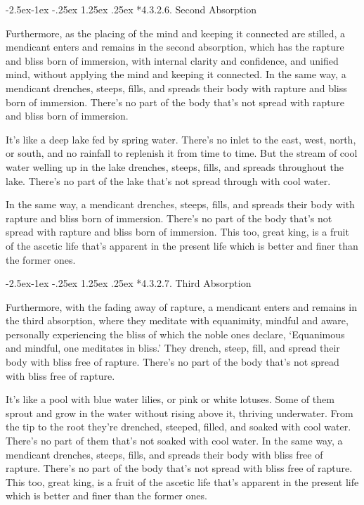 \documentclass[12pt,openany]{book}%
\makeatletter
\renewcommand\paragraph{\@startsection{paragraph}{4}{\z@}%
            {-2.5ex\@plus -1ex \@minus -.25ex}%
            {1.25ex \@plus .25ex}%
            {\noindent\Semiboldnormalfont\normalsize}}
\makeatother
\begin{document}
\paragraph*{4.3.2.6. Second Absorption }

Furthermore, as the placing of the mind and keeping it connected are stilled, a mendicant enters and remains in the second absorption, which has the rapture and bliss born of immersion, with internal clarity and confidence, and unified mind, without applying the mind and keeping it connected. In the same way, a mendicant drenches, steeps, fills, and spreads their body with rapture and bliss born of immersion. There’s no part of the body that’s not spread with rapture and bliss born of immersion. 

It’s like a deep lake fed by spring water. There’s no inlet to the east, west, north, or south, and no rainfall to replenish it from time to time. But the stream of cool water welling up in the lake drenches, steeps, fills, and spreads throughout the lake. There’s no part of the lake that’s not spread through with cool water. 

In the same way, a mendicant drenches, steeps, fills, and spreads their body with rapture and bliss born of immersion. There’s no part of the body that’s not spread with rapture and bliss born of immersion. This too, great king, is a fruit of the ascetic life that’s apparent in the present life which is better and finer than the former ones. 

\paragraph*{4.3.2.7. Third Absorption }

Furthermore, with the fading away of rapture, a mendicant enters and remains in the third absorption, where they meditate with equanimity, mindful and aware, personally experiencing the bliss of which the noble ones declare, ‘Equanimous and mindful, one meditates in bliss.’ They drench, steep, fill, and spread their body with bliss free of rapture. There’s no part of the body that’s not spread with bliss free of rapture. 

It’s like a pool with blue water lilies, or pink or white lotuses. Some of them sprout and grow in the water without rising above it, thriving underwater. From the tip to the root they’re drenched, steeped, filled, and soaked with cool water. There’s no part of them that’s not soaked with cool water. In the same way, a mendicant drenches, steeps, fills, and spreads their body with bliss free of rapture. There’s no part of the body that’s not spread with bliss free of rapture. This too, great king, is a fruit of the ascetic life that’s apparent in the present life which is better and finer than the former ones. 
\end{document}
